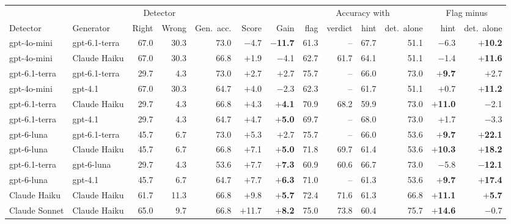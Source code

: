 \begin{table}[t]
\centering\footnotesize
\setlength{\tabcolsep}{3pt}
\begin{tabular}{llrrrrrrrrrrr}
\toprule
& & \multicolumn{2}{c}{Detector} & & & & \multicolumn{4}{c}{Accuracy with} & \multicolumn{2}{c}{Flag minus} \\
\cmidrule(lr){3-4}\cmidrule(lr){8-11}\cmidrule(lr){12-13}
Detector & Generator & Right & Wrong & Gen.\ acc. & Score & Gain & flag & verdict & hint & det.\ alone & hint & det.\ alone \\
\midrule
gpt-4o-mini & gpt-6.1-terra & 67.0 & 30.3 & 73.0 & $-$4.7 & \textbf{$-$11.7} & 61.3 & -- & 67.7 & 51.1 & $-$6.3 & \textbf{$+$10.2} \\
gpt-4o-mini & Claude Haiku & 67.0 & 30.3 & 66.8 & $+$1.9 & $-$4.1 & 62.7 & 61.7 & 64.1 & 51.1 & $-$1.4 & \textbf{$+$11.6} \\
gpt-6.1-terra & gpt-6.1-terra & 29.7 & 4.3 & 73.0 & $+$2.7 & $+$2.7 & 75.7 & -- & 66.0 & 73.0 & \textbf{$+$9.7} & $+$2.7 \\
gpt-4o-mini & gpt-4.1 & 67.0 & 30.3 & 64.7 & $+$4.0 & $-$2.3 & 62.3 & -- & 61.7 & 51.1 & $+$0.7 & \textbf{$+$11.2} \\
gpt-6.1-terra & Claude Haiku & 29.7 & 4.3 & 66.8 & $+$4.3 & \textbf{$+$4.1} & 70.9 & 68.2 & 59.9 & 73.0 & \textbf{$+$11.0} & $-$2.1 \\
gpt-6.1-terra & gpt-4.1 & 29.7 & 4.3 & 64.7 & $+$4.7 & \textbf{$+$5.0} & 69.7 & -- & 68.0 & 73.0 & $+$1.7 & $-$3.3 \\
gpt-6-luna & gpt-6.1-terra & 45.7 & 6.7 & 73.0 & $+$5.3 & $+$2.7 & 75.7 & -- & 66.0 & 53.6 & \textbf{$+$9.7} & \textbf{$+$22.1} \\
gpt-6-luna & Claude Haiku & 45.7 & 6.7 & 66.8 & $+$7.1 & \textbf{$+$5.0} & 71.8 & 69.7 & 61.4 & 53.6 & \textbf{$+$10.3} & \textbf{$+$18.2} \\
gpt-6.1-terra & gpt-6-luna & 29.7 & 4.3 & 53.6 & $+$7.7 & \textbf{$+$7.3} & 60.9 & 60.6 & 66.7 & 73.0 & $-$5.8 & \textbf{$-$12.1} \\
gpt-6-luna & gpt-4.1 & 45.7 & 6.7 & 64.7 & $+$7.7 & \textbf{$+$6.3} & 71.0 & -- & 61.3 & 53.6 & \textbf{$+$9.7} & \textbf{$+$17.4} \\
Claude Haiku & Claude Haiku & 61.7 & 11.3 & 66.8 & $+$9.8 & \textbf{$+$5.7} & 72.4 & 71.6 & 61.3 & 66.8 & \textbf{$+$11.1} & \textbf{$+$5.7} \\
Claude Sonnet & Claude Haiku & 65.0 & 9.7 & 66.8 & $+$11.7 & \textbf{$+$8.2} & 75.0 & 73.8 & 60.4 & 75.7 & \textbf{$+$14.6} & $-$0.7 \\

\end{tabular}
\end{table}
